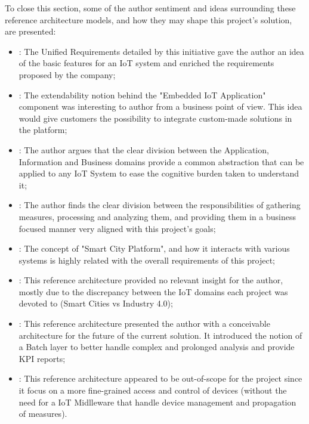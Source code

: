 To close this section, some of the author sentiment and ideas surrounding these reference architecture models, and how they may shape this project's solution, are presented:

\begin{itemize}
    \item {}: The Unified Requirements detailed by this initiative gave the author an idea of the basic features for an \gls{IoT} system and enriched the requirements proposed by the company;
    \item {}: The extendability notion behind the "Embedded IoT Application" component was interesting to author from a business point of view. This idea would give customers the possibility to integrate custom-made solutions in the platform;
    \item {}: The author argues that the clear division between the Application, Information and Business domains provide a common abstraction that can be applied to any \gls{IoT} System to ease the cognitive burden taken to understand it;
    \item {}: The author finds the clear division between the responsibilities of gathering measures, processing and analyzing them, and providing them in a business focused manner very aligned with this project's goals;
    \item {}: The concept of "Smart City Platform", and how it interacts with various systems is highly related with the overall requirements of this project;
    \item {}: This reference architecture provided no relevant insight for the author, mostly due to the discrepancy between the \gls{IoT} domains each project was devoted to (Smart Cities vs Industry 4.0);
    \item {}: This reference architecture presented the author with a conceivable architecture for the future of the current solution. It introduced the notion of a Batch layer to better handle complex and prolonged analysis and provide \gls{KPI} reports;
    \item {}: This reference architecture appeared to be out-of-scope for the project since it focus on a more fine-grained access and control of devices (without the need for a \gls{IoT} Midlleware that handle device management and propagation of measures).
\end{itemize}

